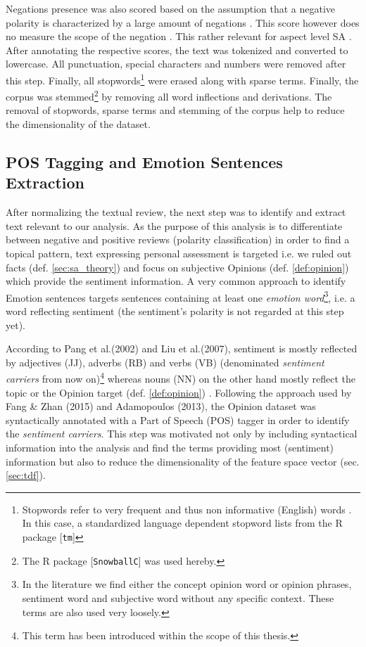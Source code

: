 \documentclass[
	a4paper,
	pdftex,
	12pt,	
	footinclude=true,
	fleqn,
	final,
	]{report}%
\begin{document}
Negations presence was also scored based on the assumption that a negative polarity is 
characterized by a large amount of negations \cite{Adamopoulos2013}. This score however does 
no measure the scope of the negation \cite{Fang2015}. This rather relevant for aspect 
level SA \cite{Liu2012}. After annotating the respective scores, the text was tokenized and converted 
to lowercase. All punctuation, special characters and numbers were removed after this step. 
Finally, all stopwords\footnote{Stopwords refer to very frequent and thus non informative (English) 
words \cite{Liu2012a}. In this case, a standardized language dependent stopword lists from the R 
package [\texttt{tm}]} were erased along with sparse terms. Finally, the corpus was 
stemmed\footnote{The R package [\texttt{SnowballC}] was used hereby.} by removing all 
word inflections and derivations. The removal of stopwords, sparse terms and stemming of the 
corpus help to reduce the dimensionality of the dataset. 

\vspace{-0.45cm}
\subsection{POS Tagging and Emotion Sentences Extraction}
\label{sec:pos}
\vspace{-0.3cm}

After normalizing the textual review, the next step was to identify and extract
text relevant to our analysis. As the purpose of this analysis 
is to differentiate between negative and positive 
reviews (polarity classification) in order to find a topical pattern, 
text expressing personal assessment is targeted i.e. we ruled out facts (def. \ref{sec:sa_theory})
and focus on subjective Opinions (def. \ref{def:opinion})
which provide the sentiment information. A very common approach 
to identify Emotion sentences targets sentences containing at least one
\emph{emotion word}\footnote{In the literature we find either the concept
opinion word or opinion phrases, sentiment word and subjective word 
without any specific context. These terms are also used very loosely.}, 
i.e. a word reflecting sentiment (the sentiment's polarity is not regarded 
at this step yet).

According to Pang et al.(2002) and 
Liu et al.(2007), sentiment is mostly reflected by adjectives (JJ), adverbs (RB) 
and verbs (VB) \cite{Liu2007,Pang2008} (denominated \emph{sentiment carriers} from now on)\footnote{This term has been introduced within the 
scope of this thesis.} whereas nouns (NN) on the other hand 
mostly reflect the topic or the Opinion target (def. \ref{def:opinion}) \cite{Manning1999,Liu2012}.
Following the approach used by Fang \& Zhan (2015) and Adamopoulos (2013), 
the Opinion dataset was syntactically annotated with a 
Part of Speech (POS) tagger in order to identify the \emph{sentiment carriers}. 
This step was motivated not only by including syntactical information into the analysis
and find the terms providing most (sentiment) information but also 
to reduce the dimensionality of the feature space vector (sec.\ref{sec:tdf}). 
\end{document}
